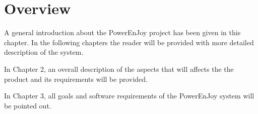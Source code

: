\section{Overview}

A general introduction about the PowerEnJoy project has been given in this chapter. In the following chapters the reader will be provided with more detailed description of the system.

In Chapter 2, an overall description of the aspects that will affects the the product and its requirements will be provided.

In Chapter 3, all goals and software requirements of the PowerEnJoy system will be pointed out.